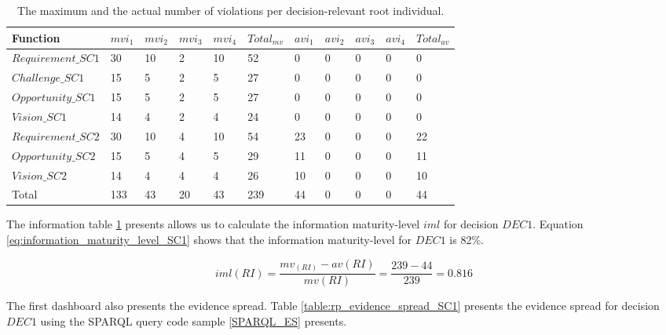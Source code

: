 \begin{table}[H]
\centering
\caption{The maximum and the actual number of violations per decision-relevant root individual.}
\begin{tabular}{| p{3cm} | p{0.8cm} | p{0.8cm} | p{0.8cm} | p{0.8cm} | p{1.2cm} | p{0.8cm} | p{0.8cm} | p{0.8cm} | p{0.8cm} | p{1.2cm} |}
\hline
\rowcolor{document}
\color{documentText}Function & \color{documentText}$mvi_1$ & \color{documentText}$mvi_2$ & \color{documentText}$mvi_3$ & \color{documentText}$mvi_4$ & \color{documentText}$Total_{mv}$ & \color{documentText}$avi_1$ & \color{documentText}$avi_2$ & \color{documentText}$avi_3$ & \color{documentText}$avi_4$ & \color{documentText}$Total_{av}$ \\
\hline
$Requirement\_SC1$ 	& 30 & 10 & 2 & 10 & 52 & 0 & 0 & 0 & 0 & 0\\
\hdashline
$Challenge\_SC1$ 	& 15 & 5 & 2 & 5 & 27 & 0 & 0 & 0 & 0 & 0\\
\hdashline
$Opportunity\_SC1$ 	& 15 & 5 & 2 & 5 & 27 & 0 & 0 & 0 & 0 & 0\\
\hdashline
$Vision\_SC1$ 		& 14 & 4 & 2 & 4 & 24 & 0 & 0 & 0 & 0 & 0\\ 
\hdashline
$Requirement\_SC2$ 	& 30 & 10 & 4 & 10 & 54 & 23 & 0 & 0 & 0 & 22 \\ 
\hdashline
$Opportunity\_SC2$ 	& 15 & 5 & 4 & 5 & 29 & 11 & 0 & 0 & 0 & 11 \\ 
\hdashline
$Vision\_SC2$ 		& 14 & 4 & 4 & 4 & 26 & 10 & 0 & 0 & 0 & 10 \\
\hdashline
Total 				& 133 & 43 & 20 & 43 & 239 & 44 & 0 & 0 & 0 & 44 \\
\hline
\end{tabular}
\label{table:rp_maximum_evidence_sc1}
\end{table}

The information table \ref{table:rp_maximum_evidence_sc1} presents allows us to calculate the information maturity-level $iml$ for decision $DEC1$. Equation \ref{eq:information_maturity_level_SC1} shows that the information maturity-level for $DEC1$ is 82\%.

\begin{equation} \label{eq:information_maturity_level_SC1}
iml(RI) = \dfrac{mv_(RI)-av(RI)}{mv(RI)} = \dfrac{239-44}{239} = 0.816
\end{equation}

The first dashboard also presents the evidence spread. Table \ref{table:rp_evidence_spread_SC1} presents the evidence spread for decision $DEC1$ using the SPARQL query code sample \ref{SPARQL_ES} presents.


